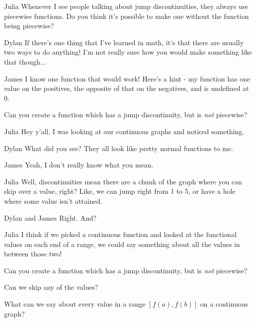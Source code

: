 \documentclass{ximera}
\begin{document}
\begin{dialogue}
\item[Julia] Whenever I see people talking about jump discontinuities, they always use piecewise functions. Do you think it's possible to make one without the function being piecewise?
\item[Dylan] If there's one thing that I've learned in math, it`s that there are usually two ways to do anything! I'm not really sure how you would make something like that though...
\item[James] I know one function that would work! Here's a hint - my function has one value on the positives, the opposite of that on the negatives, and is undefined at 0.
\end{dialogue}

\begin{question}
Can you create a function which has a jump discontinuity, but is \textit{not} piecewise?
\begin{freeResponse}
\end{freeResponse}
\end{question}

\begin{dialogue}
\item[Julia] Hey y'all, I was looking at our continuous graphs and noticed something.
\item[Dylan] What did you see? They all look like pretty normal functions to me.
\item[James] Yeah, I don't really know what you mean.
\item[Julia] Well, discontinuities mean there are a chunk of the graph where you can skip over a value, right? Like, we can jump right from 1 to 5, or have a hole where some value isn't attained.
\item[Dylan and James] Right. And?
\item[Julia] I think if we picked a continuous function and looked at the functional values on each end of a range, we could say something about all the values in between those two!
\end{dialogue}

\begin{question}
Can you create a function which has a jump discontinuity, but is \textit{not} piecewise?
\begin{freeResponse}
\end{freeResponse}
\end{question}

\begin{question}
\begin{hint}
Can we skip any of the values?
\end{hint}
What can we say about every value in a range $[f(a),f(b)]$ on a continuous graph?
\begin{freeResponse}
\end{freeResponse}
\end{question}
\end{document}

